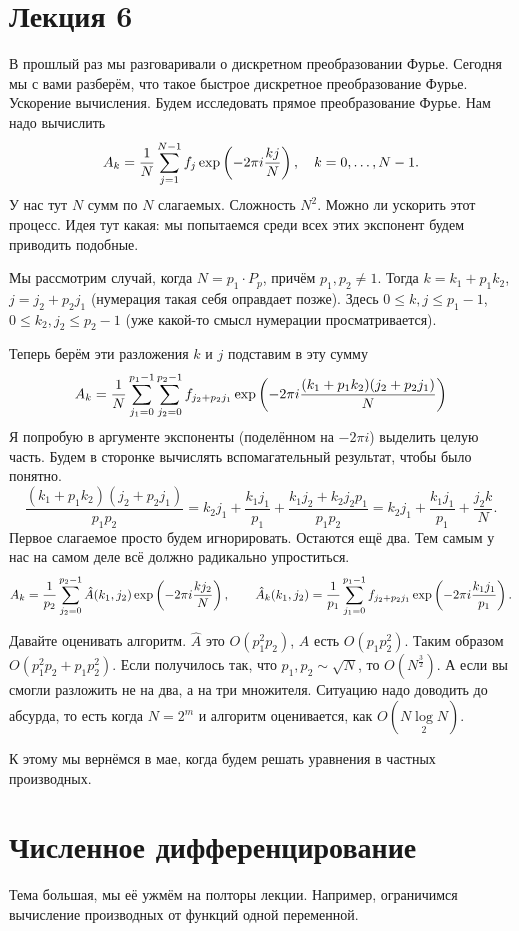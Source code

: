 \section{Лекция 6}
В прошлый раз мы разговаривали о дискретном преобразовании Фурье. Сегодня мы с вами разберём, что такое быстрое дискретное преобразование Фурье. Ускорение вычисления. Будем исследовать прямое преобразование Фурье. Нам надо вычислить 
\[
  A_k = \frac 1N \sum\limits_{j = 1}^{N-1} f_j \exp \left( -2\pi i \frac{ kj}N \right),\quad k=0,\dots, N-1.
\]
У нас тут $N$ сумм по $N$ слагаемых. Сложность $N^2$. Можно ли ускорить этот процесс. Идея тут какая: мы попытаемся среди всех этих экспонент будем приводить подобные.

Мы рассмотрим случай, когда $N = p_1\cdot P_p$, причём $p_1,p_2\ne 1$. Тогда $k = k_1  + p_1 k_2$, $j = j_2 + p_2 j_1$ (нумерация такая себя оправдает позже). Здесь $0\le k,j\le p_1-1$, $0\le k_2,j_2\le p_2 -1$ (уже какой-то смысл нумерации просматривается).

Теперь берём эти разложения $k$ и $j$ подставим в эту сумму
\[
  A_k = \frac 1N \sum\limits_{j_1 = 0}^{p_1-1} \sum\limits_{j_2 = 0}^{p_2-1} f_{j_2 + p_2 j_1} \exp \left( 
   -2\pi i\frac{(k_1 + p_1 k_2)(j_2 + p_2 j_1)}{N}
 \right)
\]
Я попробую в аргументе экспоненты (поделённом на $-2\pi i$) выделить целую часть. Будем в сторонке вычислять вспомагательный результат, чтобы было понятно.
\[
  \frac{(k_1 + p_1 k_2)(j_2 + p_2 j_1)}{p_1p_2} = 
  k_2 j_1 + \frac{ k_1 j_1}{p_1} + \frac{ k_1j_2 + k_2 j_2 p_1}{p_1 p_2} = k_2 j_1 + \frac{k_1 j_1}{p_1} + \frac{j_2 k}{N}.
\]
Первое слагаемое просто будем игнорировать. Остаются ещё два. Тем самым у нас на самом деле всё должно радикально упроститься.
\[
 A_k = \frac1{p_2} \sum\limits_{j_2 = 0}^{p_2-1} \hat A(k_1,j_2) \exp \left( -2\pi i \frac{k j_2}{N} \right),\qquad
 \hat A_k(k_1,j_2) = \frac1{p_1}\sum\limits_{j_1 = 0}^{p_1-1} f_{j_2+p_2j_1} \exp\left( -2\pi i \frac{k_1 j_1}{p_1} \right).
\]

Давайте оценивать алгоритм. $\hat A$ это $O(p_1^2 p_2)$,  $A$ есть $O(p_1 p_2^2)$. Таким образом $O(p_1^2 p_2 + p_1 p_2^2)$. Если получилось так, что $p_1,p_2 \sim \sqrt{N}$, то $O(N^{\frac32})$. А если вы смогли разложить не на два, а на три множителя. Ситуацию надо доводить до абсурда, то есть когда $N=2^m$ и алгоритм оценивается, как $O(N\log\limits_2 N)$.

К этому мы вернёмся в мае, когда будем решать уравнения в частных производных.

\section{Численное дифференцирование}
Тема большая, мы её ужмём на полторы лекции. Например, ограничимся вычисление производных от функций одной переменной.

